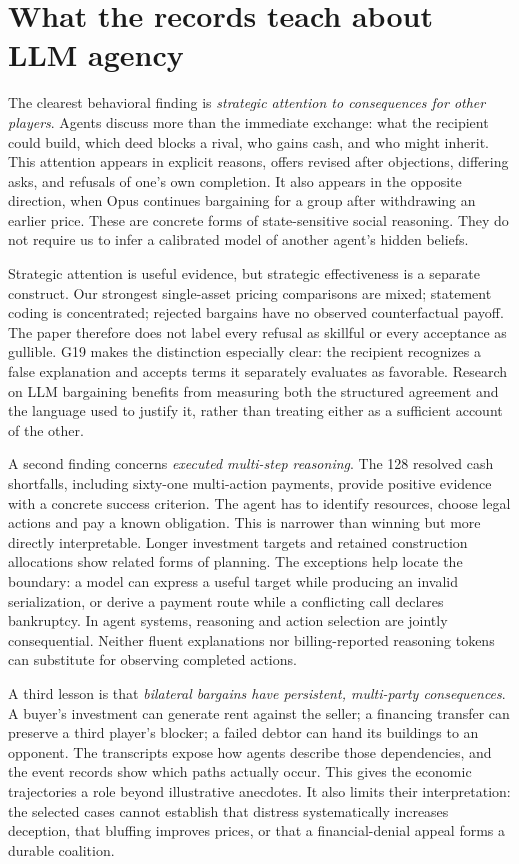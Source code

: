 \section{What the records teach about LLM agency}
\label{sec:discussion}

The clearest behavioral finding is \emph{strategic attention to consequences for other players}. Agents discuss more than the immediate exchange: what the recipient could build, which deed blocks a rival, who gains cash, and who might inherit. This attention appears in explicit reasons, offers revised after objections, differing asks, and refusals of one's own completion. It also appears in the opposite direction, when Opus continues bargaining for a group after withdrawing an earlier price. These are concrete forms of state-sensitive social reasoning. They do not require us to infer a calibrated model of another agent's hidden beliefs.

Strategic attention is useful evidence, but strategic effectiveness is a separate construct. Our strongest single-asset pricing comparisons are mixed; statement coding is concentrated; rejected bargains have no observed counterfactual payoff. The paper therefore does not label every refusal as skillful or every acceptance as gullible. G19 makes the distinction especially clear: the recipient recognizes a false explanation and accepts terms it separately evaluates as favorable. Research on LLM bargaining benefits from measuring both the structured agreement and the language used to justify it, rather than treating either as a sufficient account of the other.

A second finding concerns \emph{executed multi-step reasoning}. The 128 resolved cash shortfalls, including sixty-one multi-action payments, provide positive evidence with a concrete success criterion. The agent has to identify resources, choose legal actions and pay a known obligation. This is narrower than winning but more directly interpretable. Longer investment targets and retained construction allocations show related forms of planning. The exceptions help locate the boundary: a model can express a useful target while producing an invalid serialization, or derive a payment route while a conflicting call declares bankruptcy. In agent systems, reasoning and action selection are jointly consequential. Neither fluent explanations nor billing-reported reasoning tokens can substitute for observing completed actions.

A third lesson is that \emph{bilateral bargains have persistent, multi-party consequences}. A buyer's investment can generate rent against the seller; a financing transfer can preserve a third player's blocker; a failed debtor can hand its buildings to an opponent. The transcripts expose how agents describe those dependencies, and the event records show which paths actually occur. This gives the economic trajectories a role beyond illustrative anecdotes. It also limits their interpretation: the selected cases cannot establish that distress systematically increases deception, that bluffing improves prices, or that a financial-denial appeal forms a durable coalition.

